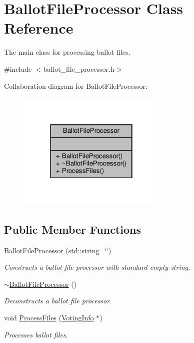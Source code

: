 \hypertarget{classBallotFileProcessor}{}\section{Ballot\+File\+Processor Class Reference}
\label{classBallotFileProcessor}


The main class for processing ballot files.  




{\ttfamily \#include $<$ballot\+\_\+file\+\_\+processor.\+h$>$}



Collaboration diagram for Ballot\+File\+Processor\+:
\nopagebreak
\begin{figure}[H]
\begin{center}
\leavevmode
\includegraphics[width=202pt]{classBallotFileProcessor__coll__graph}
\end{center}
\end{figure}
\subsection*{Public Member Functions}
\begin{DoxyCompactItemize}
\item 
\hyperlink{classBallotFileProcessor_aadc47aedf9172bfc26b2b6324dc40576}{Ballot\+File\+Processor} (std\+::string=\char`\"{}\char`\"{})
\begin{DoxyCompactList}\small\item\em Constructs a ballot file processor with standard empty string. \end{DoxyCompactList}\item 
\mbox{\label{classBallotFileProcessor_a372429408537c8919b969a23c3cc7e41}} 
\hyperlink{classBallotFileProcessor_a372429408537c8919b969a23c3cc7e41}{$\sim$\+Ballot\+File\+Processor} ()
\begin{DoxyCompactList}\small\item\em Deconstructs a ballot file processor. \end{DoxyCompactList}\item 
void \hyperlink{classBallotFileProcessor_a3d25f1db840f21ab7d19f4b4898193c9}{Process\+Files} (\hyperlink{classVotingInfo}{Voting\+Info} $\ast$)
\begin{DoxyCompactList}\small\item\em Processes ballot files. \end{DoxyCompactList}\end{DoxyCompactItemize}


